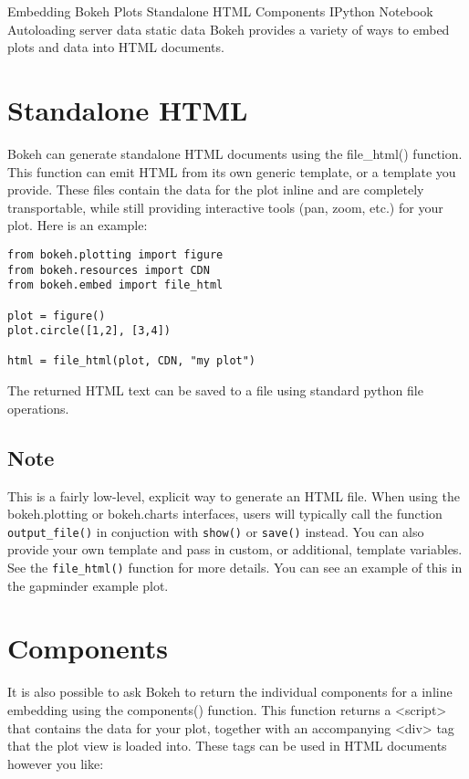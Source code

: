 Embedding Bokeh Plots
Standalone HTML
Components
IPython Notebook
Autoloading
server data
static data
Bokeh provides a variety of ways to embed plots and data into HTML documents.
\section{Standalone HTML}
Bokeh can generate standalone HTML documents using the file_html() function. This function can emit HTML from its own generic template, or a template you provide. These files contain the data for the plot inline and are completely transportable, while still providing interactive tools (pan, zoom, etc.) for your plot. Here is an example:

\begin{framed}
\begin{verbatim}
from bokeh.plotting import figure
from bokeh.resources import CDN
from bokeh.embed import file_html

plot = figure()
plot.circle([1,2], [3,4])

html = file_html(plot, CDN, "my plot")

\end{verbatim}
\end{framed}

The returned HTML text can be saved to a file using standard python file operations.

\subsection{Note}
This is a fairly low-level, explicit way to generate an HTML file. When using the bokeh.plotting or bokeh.charts interfaces, users will typically call the function \texttt{output\_file()} in conjuction with \texttt{show()} or \texttt{save()} instead.
You can also provide your own template and pass in custom, or additional, template variables. See the \texttt{file\_html()} function for more details. You can see an example of this in the gapminder example plot.

\section{Components}
It is also possible to ask Bokeh to return the individual components for a inline embedding using the components() function. This function returns a <script> that contains the data for your plot, together with an accompanying <div> tag that the plot view is loaded into. These tags can be used in HTML documents however you like:

